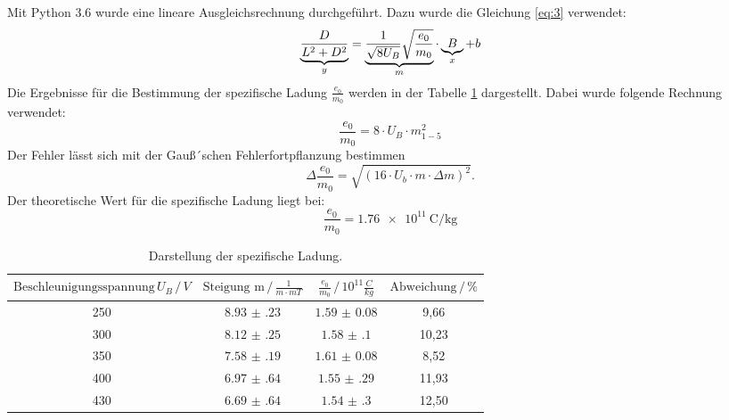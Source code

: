 Mit Python 3.6 wurde eine lineare Ausgleichsrechnung durchgeführt.
Dazu wurde die Gleichung \ref{eq:3} verwendet:
\begin{equation*}
  \underbrace{\frac{D}{L^2+D^2}}_{\mathclap{y}} = \underbrace{\frac{1}{\sqrt{8U_B}} \sqrt{\frac{e_0}{m_0}}}_{\mathclap{m}} \cdot \underbrace{B}_{\mathclap{x}} + b
\end{equation*}
Die Ergebnisse für die Bestimmung der spezifische Ladung $\frac{e_0}{m_0}$ werden
in der Tabelle \ref{tab:6} dargestellt. Dabei wurde folgende Rechnung verwendet:
\begin{equation*}
  \frac{e_0}{m_0} = 8 \cdot U_B \cdot m_{1-5}^2
\end{equation*}
Der Fehler lässt sich mit der Gauß´schen Fehlerfortpflanzung bestimmen
\begin{equation*}
  \Delta \frac{e_0}{m_0} = \sqrt{(16 \cdot U_b \cdot m \cdot \Delta m)^2}.
\end{equation*}
Der theoretische Wert für die spezifische Ladung liegt bei:
\begin{equation*}
  \frac{e_0}{m_0}=\SI{1.76e11}{\coulomb\per\kilogram}
\end{equation*}

\begin{table}[H]
  \centering
  \caption{Darstellung der spezifische Ladung.}
  \label{tab:6}
  \begin{tabular}{c c c c}
\toprule
$\text{Beschleunigungsspannung}\, U_B \,/\, V$ & $\text{Steigung m} \,/\, \frac{1}{m\cdot mT}$ &$\frac{e_0}{m_0} \,/\, 10^{11}\frac{C}{kg}$ & $\text{Abweichung} \,/\, \%$\\
\midrule
250 &$\num{8.93(23)}$ &$\num{1.59(8)}$ &  9,66\\
300 &$\num{8.12(25)}$ &$\num{1.58(10)}$& 10,23\\
350 &$\num{7.58(19)}$ &$\num{1.61(8)}$ &  8,52\\
400 &$\num{6.97(64)}$ &$\num{1.55(29)}$& 11,93\\
430 &$\num{6.69(64)}$ &$\num{1.54(30)}$& 12,50\\
\bottomrule
  \end{tabular}
\end{table}

